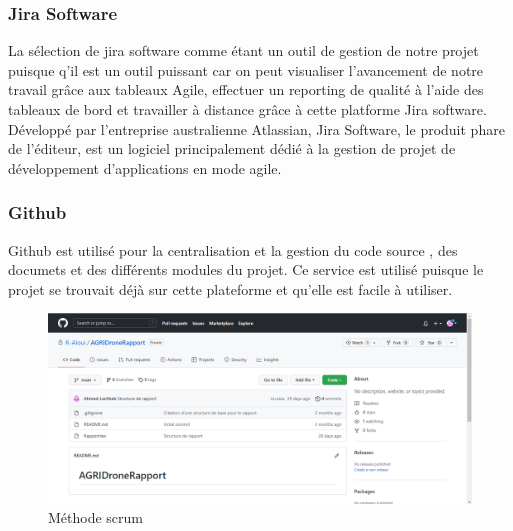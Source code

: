 \documentclass[a4paper,12pt]{report}
\begin{document}
	\subsubsection{Jira Software}
	La sélection de jira software comme étant un outil de gestion de notre projet puisque q'il est un outil puissant car on peut visualiser l'avancement de notre travail grâce aux tableaux Agile, effectuer un reporting de qualité à l’aide des tableaux de bord et travailler à distance grâce à cette platforme Jira software.
	Développé par l'entreprise australienne Atlassian, Jira Software, le produit phare de l'éditeur, est un logiciel principalement dédié à la gestion de projet de développement d'applications en mode agile.
	\subsubsection{Github}
	Github est utilisé pour la centralisation et la gestion du code source , des documets et des différents modules du projet. Ce service est utilisé puisque le projet se trouvait déjà sur cette plateforme et qu’elle est
	facile à utiliser.
	\begin{figure} [h]
		\begin{center}
			\centering
			\includegraphics[width=0.7\linewidth]{Images/2022-04-09 (6)}
		\end{center}
		\caption{Méthode scrum}
	\end{figure}
\end{document}
